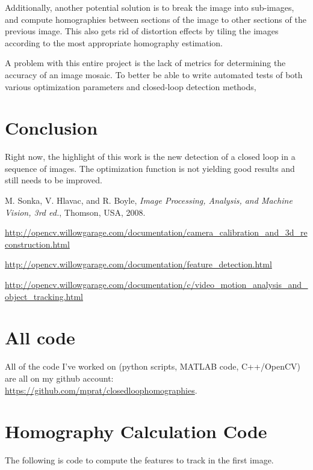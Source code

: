 \documentclass{article}
\begin{document}
Additionally, another potential solution is to break the image into sub-images,
and compute homographies between sections of the image to other sections of the
previous image. This also gets rid of distortion effects by tiling the images
according to the most appropriate homography estimation. 

A problem with this entire project is the lack of metrics for determining the
accuracy of an image mosaic. To better be able to write automated tests of both
various optimization parameters and closed-loop detection methods, 

\section{Conclusion}

Right now, the highlight of this work is the new detection of a closed loop in
a sequence of images. The optimization function is not yielding good results
and still needs to be improved. 

\begin{thebibliography}{1}

 M. Sonka, V. Hlavac, and R. Boyle, \emph{Image Processing, Analysis, and Machine Vision, 3rd ed.}, Thomson, USA, 2008.

 \url{http://opencv.willowgarage.com/documentation/camera_calibration_and_3d_reconstruction.html}

 \url{http://opencv.willowgarage.com/documentation/feature_detection.html}

 \url{http://opencv.willowgarage.com/documentation/c/video_motion_analysis_and_object_tracking.html}

\end{thebibliography}

\appendix
\section{All code}

All of the code I've worked on (python scripts, MATLAB code, C++/OpenCV) are all on my github account: \url{https://github.com/mprat/closedloophomographies}.

\section{Homography Calculation Code}
\label{apdx:code}

The following is code to compute the features to track in the first image.
\end{document}
